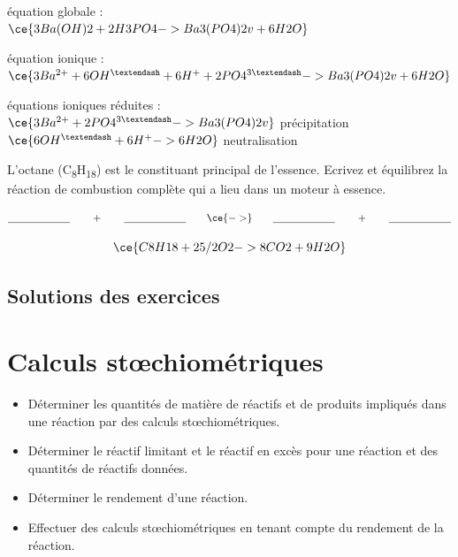 \documentclass[
  11pt,
  a4paper,
  openany]{book}
\providecommand{\tightlist}{%
  \setlength{\itemsep}{0pt}\setlength{\parskip}{0pt}}
\begin{document}
\begin{Answer}
équation globale :\\
\(\ce{3 Ba(OH)2 + 2 H3PO4 -> Ba3(PO4)2 v + 6 H2O}\)

équation ionique :\\
\(\ce{3Ba^{2+} + 6 OH^{–} + 6 H^{+} + 2PO4^{3–} -> Ba3(PO4)2 v + 6 H2O}\)

équations ioniques réduites :\\
\(\ce{3Ba^{2+} + 2PO4^{3–} -> Ba3(PO4)2 v}\) précipitation\\
\(\ce{6 OH^{–} + 6 H^{+} -> 6 H2O}\) neutralisation

\end{Answer}

\begin{Exercise}
L'octane (C\textsubscript{8}H\textsubscript{18}) est le constituant principal de l'essence. Ecrivez et équilibrez la réaction de combustion complète qui a lieu dans un moteur à essence.

\[ \underline{\hspace{6em}} \qquad + \qquad \underline{\hspace{6em}} \qquad \ce{->} \qquad \underline{\hspace{6em}} \qquad + \qquad \underline{\hspace{6em}} \]

\end{Exercise}

\begin{Answer}
\[ \ce{C8H18 + 25/2O2 -> 8CO2 + 9H2O} \]

\end{Answer}

\newpage

\section{Solutions des exercices} \shipoutAnswer

\chapter{Calculs stœchiométriques}\label{calculs-stux153chiomuxe9triques}

\begin{objectives}

\begin{itemize}
\tightlist
\item
  Déterminer les quantités de matière de réactifs et de produits impliqués dans une réaction par des calculs stœchiométriques.
\item
  Déterminer le réactif limitant et le réactif en excès pour une réaction et des quantités de réactifs données.
\item
  Déterminer le rendement d'une réaction.
\item
  Effectuer des calculs stœchiométriques en tenant compte du rendement de la réaction.
\end{itemize}

\end{objectives}
\end{document}
